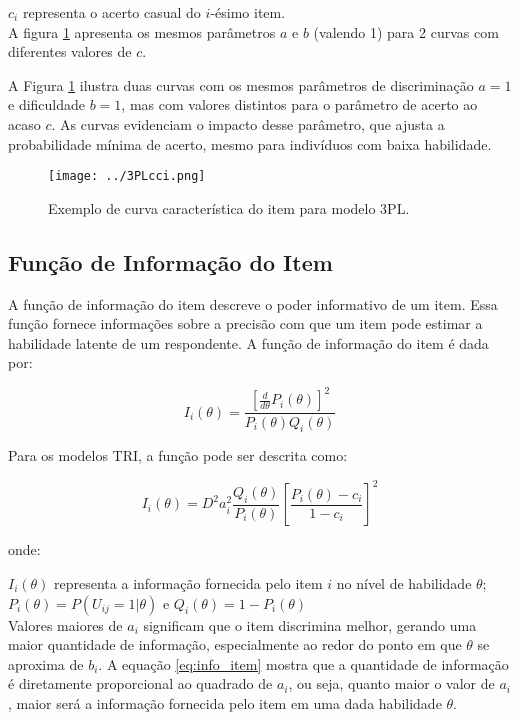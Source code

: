\noindent $c_i$ representa o acerto casual do $i$-ésimo item.\\


A figura \ref{fig:3PL} apresenta os mesmos parâmetros $a$ e $b$ (valendo 1) para 2 curvas com diferentes valores de $c$.

A Figura \ref{fig:3PL} ilustra duas curvas com os mesmos parâmetros de discriminação $a = 1$ e dificuldade $b = 1$, mas com valores distintos para o parâmetro de acerto ao acaso $c$. As curvas evidenciam o impacto desse parâmetro, que ajusta a probabilidade mínima de acerto, mesmo para indivíduos com baixa habilidade. 

\begin{figure}[H]
	\centering
	\caption{Exemplo de curva característica do item para modelo 3PL.}
	\texttt{[image: ../3PLcci.png]}
	\parbox{\textwidth}{
		\centering %
	}
	\label{fig:3PL}
\end{figure}


\subsection{Função de Informação do Item}

A função de informação do item descreve o poder informativo de um item. Essa função fornece informações sobre a precisão com que um item pode estimar a habilidade latente de um respondente. \cite{de2000teoria} 
A função de informação do item é dada por:

\[
		I_i(\theta) = \dfrac{[\frac{d}{d\theta}P_i(\theta)]^2}{P_i(\theta)Q_i(\theta)}
\]

Para os modelos TRI, a função pode ser descrita como:

\begin{equation}\label{eq:info_item}
	I_i(\theta) = D^2 a_i^2\frac{Q_i(\theta)}{P_i(\theta)} \left[\frac{P_i(\theta) - c_i}{1 - c_i}\right]^2
\end{equation}

onde:

\noindent $I_i(\theta) $ representa a informação fornecida pelo item $i$ no nível de habilidade $\theta$;\\

\noindent $P_i(\theta) = P(U_{ij} = 1| \theta) $ e $ Q_i(\theta) = 1 - P_i(\theta) $ \\

Valores maiores de $a_i$ significam que o item discrimina melhor, gerando uma maior quantidade de informação, especialmente ao redor do ponto em que $\theta$ se aproxima de $b_i$. A equação \ref{eq:info_item} mostra que a quantidade de informação é diretamente proporcional ao quadrado de $a_i$, ou seja, quanto maior o valor de $a_i$, maior será a informação fornecida pelo item em uma dada habilidade $\theta$.

